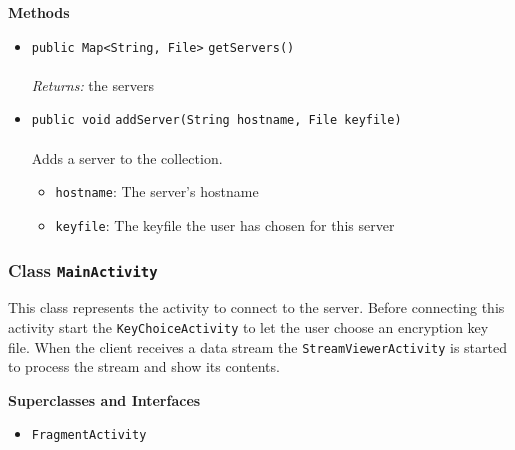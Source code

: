 \textbf{\sffamily Methods}
\begin{itemize}
\item \lstinline|public Map<String, File>| \lstinline|getServers|\lstinline|()|\\ \\[-0.6em]
\emph{Returns:} the servers



\item \lstinline|public void| \lstinline|addServer|\lstinline|(String hostname, File keyfile)|\\ \\[-0.6em]
Adds a server to the collection.
\begin{itemize}
\item \lstinline|hostname|: The server's hostname
\item \lstinline|keyfile|: The keyfile the user has chosen for this server
\end{itemize}



\end{itemize}

\subsubsection{Class \lstinline|MainActivity|}
This class represents the activity to connect to the server.
 Before connecting this activity start the \lstinline|KeyChoiceActivity| to
 let the user choose an encryption key file. When the client receives a
 data stream the \lstinline|StreamViewerActivity| is started to process the
 stream and show its contents. \\
\noindent\begin{minipage}[t]{5cm}
\vspace{0.3em}
\hspace*{2em}
\vspace{0.3em}
\end{minipage}



\textbf{\sffamily Superclasses and Interfaces}
\begin{itemize}
\item \lstinline|FragmentActivity|
\end{itemize}



